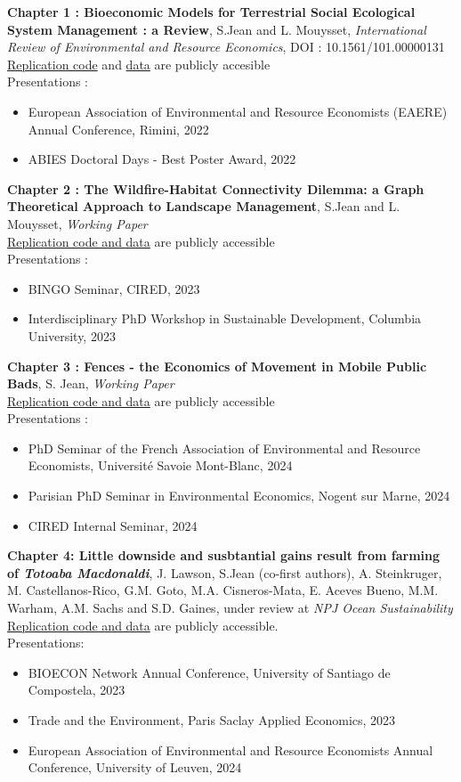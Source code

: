 \singlespacing
\textbf{Chapter 1 :  Bioeconomic Models for Terrestrial Social Ecological System Management : a Review}, S.Jean and L. Mouysset, \textit{International Review of Environmental and Resource Economics},
 DOI : 10.1561/101.00000131\\
\href{https://github.com/sim-jean/review-irere}{Replication code} and \href{https://zenodo.org/records/6656433}{data} are publicly accesible
\\
 Presentations : 
\begin{itemize}
\item European Association of Environmental and Resource Economists (EAERE) Annual Conference, Rimini, 2022
\item ABIES Doctoral Days - Best Poster Award, 2022
\end{itemize}
%
\textbf{Chapter 2 : The Wildfire-Habitat Connectivity Dilemma: a Graph Theoretical Approach to Landscape Management}, S.Jean and L. Mouysset, \textit{Working Paper}\\
\href{https://github.com/sim-jean/Landscape_connectivity_dilemma}{Replication code and data} are publicly accessible
%
\\
Presentations : 
\begin{itemize}
\item BINGO Seminar, CIRED, 2023
\item Interdisciplinary PhD Workshop in Sustainable Development, Columbia University, 2023
\end{itemize}
%
\textbf{Chapter 3 : Fences - the Economics of Movement in Mobile Public Bads}, S. Jean, \textit{Working Paper}\\
\href{https://github.com/sim-jean/fences}{Replication code and data} are publicly accessible
\\
Presentations : 
\begin{itemize}
\item PhD Seminar of the French Association of Environmental and Resource Economists, Université Savoie Mont-Blanc, 2024
\item Parisian PhD Seminar in Environmental Economics, Nogent sur Marne, 2024
\item CIRED Internal Seminar, 2024
\end{itemize}
%
\textbf{Chapter 4: Little downside and susbtantial gains result from farming of \textit{Totoaba Macdonaldi}}, J. Lawson, S.Jean (co-first authors), A. Steinkruger, M. Castellanos-Rico, G.M. Goto, M.A. Cisneros-Mata, E. Aceves Bueno, M.M. Warham, A.M. Sachs and S.D. Gaines,  under review at \textit{NPJ Ocean Sustainability}\\
\href{https://github.com/julawson/conservation_farming_totoaba}{Replication code and data} are publicly accessible.
%
\\
Presentations:
\begin{itemize}
\item BIOECON Network Annual Conference, University of Santiago de Compostela, 2023
\item Trade and the Environment, Paris Saclay Applied Economics, 2023
\item European Association of Environmental and Resource Economists Annual Conference, University of Leuven, 2024
\end{itemize}
%

\clearpage
{\footnotesize


}
\cleardoublepage




